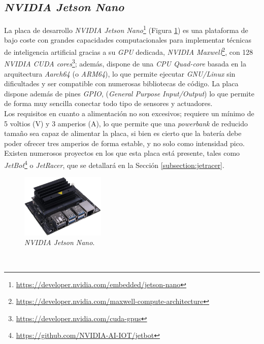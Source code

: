 \subsection{\textit{NVIDIA Jetson Nano}}
\label{subsection:jetsonnano}
La placa de desarrollo \textit{NVIDIA Jetson Nano}\footnote{\url{https://developer.nvidia.com/embedded/jetson-nano}} (Figura \ref{fig:jetsonnano}) es una plataforma de bajo coste con grandes capacidades computacionales para implementar técnicas de inteligencia artificial gracias a su \textit{GPU} dedicada, \textit{NVIDIA Maxwell}\footnote{\url{https://developer.nvidia.com/maxwell-compute-architecture}}, con 128 \textit{NVIDIA CUDA cores}\footnote{\url{https://developer.nvidia.com/cuda-gpus}}; además, dispone de una \textit{CPU Quad-core} basada en la arquitectura \textit{Aarch64} (o \textit{ARM64}), lo que permite ejecutar \textit{GNU/Linux} sin dificultades y ser compatible con numerosas bibliotecas de código. La placa dispone además de pines \textit{GPIO}, (\textit{General Purpose Input/Output}) lo que permite de forma muy sencilla conectar todo tipo de sensores y actuadores.\\

Los requisitos en cuanto a alimentación no son excesivos; requiere un mínimo de 5 voltios (V) y 3 amperios (A), lo que permite que una \textit{powerbank} de reducido tamaño sea capaz de alimentar la placa, si bien es cierto que la batería debe poder ofrecer tres amperios de forma estable, y no solo como intensidad pico. Existen numerosos proyectos en los que esta placa está presente, tales como \textit{JetBot}\footnote{\url{https://github.com/NVIDIA-AI-IOT/jetbot}} o \textit{JetRacer}, que se detallará en la Sección \ref{subsection:jetracer}.\\

\begin{figure} [h!]
	\begin{center}
		\includegraphics[width=4cm]{figs/jetsonnano}
	\end{center}
	\caption{\textit{NVIDIA Jetson Nano}.}
	\label{fig:jetsonnano}
\end{figure}\

